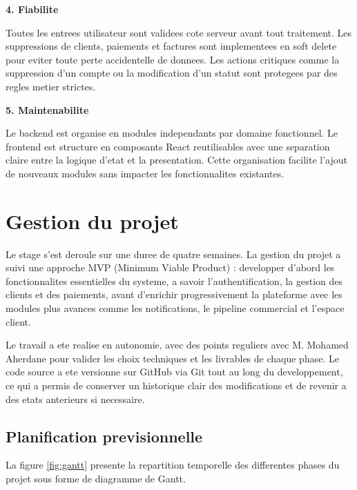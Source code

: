 \documentclass[12pt, a4paper]{report}
\begin{document}
\vspace{0.3cm}
\textbf{4. Fiabilite}

Toutes les entrees utilisateur sont validees cote serveur avant tout
traitement. Les suppressions de clients, paiements et factures sont
implementees en soft delete pour eviter toute perte accidentelle de donnees.
Les actions critiques comme la suppression d'un compte ou la modification
d'un statut sont protegees par des regles metier strictes.

\vspace{0.3cm}
\textbf{5. Maintenabilite}

Le backend est organise en modules independants par domaine fonctionnel.
Le frontend est structure en composants React reutilisables avec une separation
claire entre la logique d'etat et la presentation. Cette organisation facilite
l'ajout de nouveaux modules sans impacter les fonctionnalites existantes.

\section{Gestion du projet}

Le stage s'est deroule sur une duree de quatre semaines. La gestion du projet
a suivi une approche MVP (Minimum Viable Product) : developper d'abord les
fonctionnalites essentielles du systeme, a savoir l'authentification, la
gestion des clients et des paiements, avant d'enrichir progressivement la
plateforme avec les modules plus avances comme les notifications, le pipeline
commercial et l'espace client.

Le travail a ete realise en autonomie, avec des points reguliers avec
M. Mohamed Aherdane pour valider les choix techniques et les livrables de
chaque phase. Le code source a ete versionne sur GitHub via Git tout au long
du developpement, ce qui a permis de conserver un historique clair des
modifications et de revenir a des etats anterieurs si necessaire.

\subsection{Planification previsionnelle}

La figure \ref{fig:gantt} presente la repartition temporelle des differentes
phases du projet sous forme de diagramme de Gantt.
\end{document}
